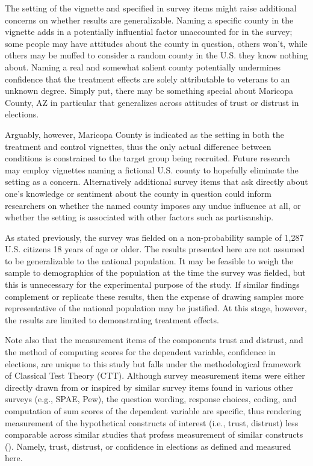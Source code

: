 \documentclass[
  12pt,
  letterpaper,
]{article}
\begin{document}
The setting of the vignette and specified in survey items might raise
additional concerns on whether results are generalizable. Naming a
specific county in the vignette adds in a potentially influential factor
unaccounted for in the survey; some people may have attitudes about the
county in question, others won't, while others may be muffed to consider
a random county in the U.S. they know nothing about. Naming a real and
somewhat salient county potentially undermines confidence that the
treatment effects are solely attributable to veterans to an unknown
degree. Simply put, there may be something special about Maricopa
County, AZ in particular that generalizes across attitudes of trust or
distrust in elections.

Arguably, however, Maricopa County is indicated as the setting in both
the treatment and control vignettes, thus the only actual difference
between conditions is constrained to the target group being recruited.
Future research may employ vignettes naming a fictional U.S. county to
hopefully eliminate the setting as a concern. Alternatively additional
survey items that ask directly about one's knowledge or sentiment about
the county in question could inform researchers on whether the named
county imposes any undue influence at all, or whether the setting is
associated with other factors such as partisanship.

As stated previously, the survey was fielded on a non-probability sample
of 1,287 U.S. citizens 18 years of age or older. The results presented
here are not assumed to be generalizable to the national population. It
may be feasible to weigh the sample to demographics of the population at
the time the survey was fielded, but this is unnecessary for the
experimental purpose of the study. If similar findings complement or
replicate these results, then the expense of drawing samples more
representative of the national population may be justified. At this
stage, however, the results are limited to demonstrating treatment
effects.

Note also that the measurement items of the components trust and
distrust, and the method of computing scores for the dependent variable,
confidence in elections, are unique to this study but falls under the
methodological framework of Classical Test Theory (CTT). Although survey
measurement items were either directly drawn from or inspired by similar
survey items found in various other surveys (e.g., SPAE, Pew), the
question wording, response choices, coding, and computation of sum
scores of the dependent variable are specific, thus rendering
measurement of the hypothetical constructs of interest (i.e., trust,
distrust) less comparable across similar studies that profess
measurement of similar constructs (). Namely, trust, distrust, or confidence in elections
as defined and measured here.
\end{document}
